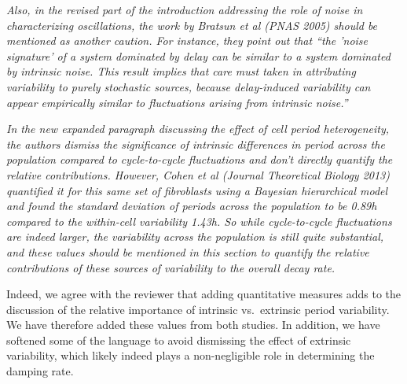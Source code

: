 \documentclass[11pt, letterpaper]{article}
\newenvironment{reviewer}{\itshape\color{gray}}{}
\begin{document}
\begin{reviewer}
Also, in the revised part of the introduction addressing the role of noise in characterizing oscillations, the work by Bratsun et al (PNAS 2005) should be mentioned as another caution. For instance, they point out that ``the 'noise signature' of a system dominated by delay can be similar to a system dominated by intrinsic noise. This result implies that care must taken in attributing variability to purely stochastic sources, because delay-induced variability can appear empirically similar to fluctuations arising from intrinsic noise.''
\end{reviewer}

\begin{reviewer}
In the new expanded paragraph discussing the effect of cell period heterogeneity, the authors dismiss the significance of intrinsic differences in period across the population compared to cycle-to-cycle fluctuations and don't directly quantify the relative contributions. However, Cohen et al (Journal Theoretical Biology 2013) quantified it for this same set of fibroblasts using a Bayesian hierarchical model and found the standard deviation of periods across the population to be 0.89h compared to the within-cell variability 1.43h. So while cycle-to-cycle fluctuations are indeed larger, the variability across the population is still quite substantial, and these values should be mentioned in this section to quantify the relative contributions of these sources of variability to the overall decay rate.
\end{reviewer}

Indeed, we agree with the reviewer that adding quantitative measures adds to the discussion of the relative importance of intrinsic vs.\ extrinsic period variability. We have therefore added these values from both studies. In addition, we have softened some of the language to avoid dismissing the effect of extrinsic variability, which likely indeed plays a non-negligible role in determining the damping rate.
\end{document}
